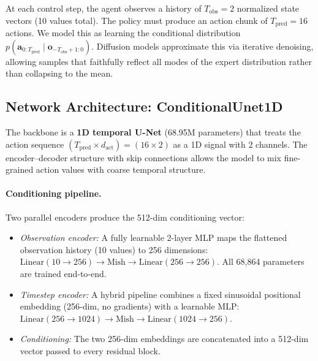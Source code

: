 \documentclass[10pt,letterpaper]{article}
\newcommand{\Tobs}{T_{\text{obs}}}
\newcommand{\Tpred}{T_{\text{pred}}}
\begin{document}
At each control step, the agent observes a history of $\Tobs = 2$ normalized state
vectors (10 values total).
The policy must produce an action chunk of $\Tpred = 16$ actions.
We model this as learning the conditional distribution
$p(\mathbf{a}_{0:\Tpred} \mid \mathbf{o}_{-\Tobs+1:0})$.
Diffusion models approximate this via iterative denoising, allowing samples that
faithfully reflect all modes of the expert distribution rather than collapsing to
the mean.

\subsection{Network Architecture: ConditionalUnet1D}
\label{sec:arch}

The backbone is a \textbf{1D temporal U-Net} (68.95M parameters) that treats the
action sequence $(\Tpred \times d_{\text{act}}) = (16 \times 2)$ as a 1D signal
with 2 channels.
The encoder--decoder structure with skip connections allows the model to mix
fine-grained action values with coarse temporal structure.

\paragraph{Conditioning pipeline.}
Two parallel encoders produce the 512-dim conditioning vector:
\begin{itemize}
  \item \emph{Observation encoder:} A fully learnable 2-layer MLP maps the flattened
    observation history (10 values) to 256 dimensions:
    $\text{Linear}(10 \!\to\! 256) \to \text{Mish} \to \text{Linear}(256 \!\to\! 256)$.
    All 68,864 parameters are trained end-to-end.
  \item \emph{Timestep encoder:} A hybrid pipeline combines a fixed sinusoidal
    positional embedding (256-dim, no gradients) with a learnable MLP:
    $\text{Linear}(256 \!\to\! 1024) \to \text{Mish} \to \text{Linear}(1024 \!\to\! 256)$.
  \item \emph{Conditioning:} The two 256-dim embeddings are concatenated into a
    512-dim vector passed to every residual block.
\end{itemize}
\end{document}
